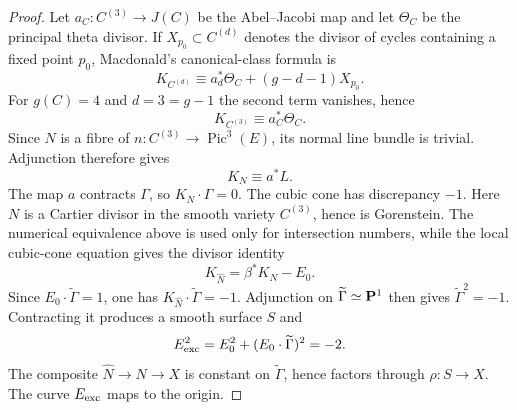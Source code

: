 \begin{proof}
Let $a_C:C^{(3)}\to J(C)$ be the Abel--Jacobi map and let $\Theta_C$ be the
principal theta divisor.  If $X_{p_0}\subset C^{(d)}$ denotes the divisor of
cycles containing a fixed point $p_0$, Macdonald's canonical-class formula is
\cite{Macdonald1962}
\[
 K_{C^{(d)}}\equiv a_d^*\Theta_C+(g-d-1)X_{p_0}.
\]
For $g(C)=4$ and $d=3=g-1$ the second term vanishes, hence
\[
 K_{C^{(3)}}\equiv a_C^*\Theta_C.
\]
Since $N$ is a fibre of $n:C^{(3)}\to\operatorname{Pic}^3(E)$, its normal
line bundle is trivial.  Adjunction therefore gives
\[
 K_N\equiv a^*L.
\]
The map $a$ contracts $\Gamma$, so $K_N\cdot\Gamma=0$.  The cubic cone has
discrepancy $-1$.  Here $N$ is a Cartier divisor in the smooth variety
$C^{(3)}$, hence is Gorenstein.  The numerical equivalence above is used
only for intersection numbers, while the local cubic-cone equation gives
the divisor identity
\[
 K_{\widehat N}=\beta^*K_N-E_0.
\]
Since $E_0\cdot\widetilde\Gamma=1$, one has
$K_{\widehat N}\cdot\widetilde\Gamma=-1$.  Adjunction on
$\widetilde\Gamma\simeq\mathbf P^1$ then gives
$\widetilde\Gamma^2=-1$.  Contracting it produces a smooth surface $S$ and
\[
 E_{\mathrm{exc}}^2=E_0^2+(E_0\cdot\widetilde\Gamma)^2=-2.
\]
The composite $\widehat N\to N\to X$ is constant on
$\widetilde\Gamma$, hence factors through $\rho:S\to X$.  The curve
$E_{\mathrm{exc}}$ maps to the origin.
\end{proof}
